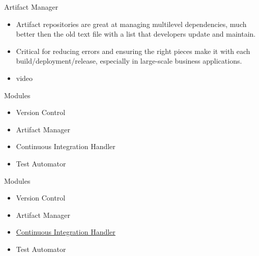 \documentclass{beamer}
\begin{document}
\begin{frame}{Artifact Manager}
\begin{itemize}

	\item Artifact repositories are great at managing multilevel dependencies, much better then the old text file with a list that developers update and maintain. 
	\vspace{0.5 cm}
\item Critical for reducing errors and ensuring the right pieces make it with each build/deployment/release, especially in large-scale business applications.
\vspace{0.5 cm}
\item video
\end{itemize}
\end{frame}


\begin{frame}{Modules}
\begin{itemize}
\item Version Control
\item Artifact Manager
\item Continuous Integration Handler
\item Test Automator

\end{itemize}

\end{frame}

\begin{frame}{Modules}
\begin{itemize}
\item Version Control
\item Artifact Manager
\item \underline{Continuous Integration Handler}
\item Test Automator

\end{itemize}

\end{frame}
\end{document}
